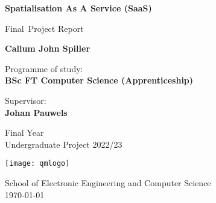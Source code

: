 
\newcommand{\reportversion}{Final}
\hypersetup{pageanchor=false}
\begin{titlepage}
    \begin{center}
        \vspace*{1cm}

        \huge
        \textbf{Spatialisation As A Service (SaaS)}

        \vspace{0.5cm}

        \large
        \reportversion~Project Report

        \vspace{1.5cm}

        \LARGE
        \textbf{Callum John Spiller}

        \vspace{1.5cm}

        \small
        Programme of study:\\
        \textbf{BSc FT Computer Science (Apprenticeship)}

        \vspace{1cm}

        Supervisor:\\
        \textbf{Johan Pauwels}

        \vfill

        \footnotesize
        Final Year\\
        Undergraduate Project 2022/23

        \vspace{0.5cm}
        \texttt{[image: qmlogo]}
        \vspace{0.5cm}

        School of Electronic Engineering and Computer Science\\
        \today

    \end{center}
\end{titlepage}